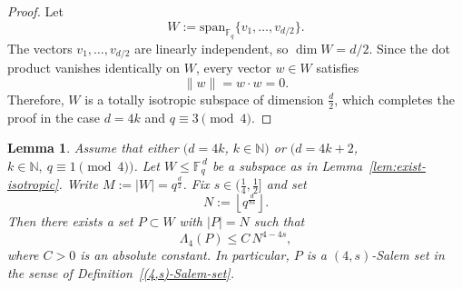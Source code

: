 \documentclass{article}
\newtheorem{lemma}[theorem]{Lemma}
\def\steven#1{\noindent
\textcolor{red}
{\textsc{(Steven:}
\textsf{#1})}}
\begin{document}
\begin{proof}
Let
\[
W:=\mathrm{span}_{\mathbb F_q}\{v_1,\dots,v_{d/2}\}.
\]
The vectors $v_1,\dots,v_{d/2}$ are linearly independent, so
$\dim W=d/2$.
Since the dot product vanishes identically on $W$, every vector $w\in W$ satisfies
\[
\|w\|=w\cdot w=0.
\]
Therefore, $W$ is a totally isotropic subspace of dimension $\frac{d}{2}$, which completes the proof in the case $d=4k$ and $q\equiv3\pmod4$.

\end{proof}



\begin{lemma}\label{lem:salem-subset-W}
Assume that either $(d=4k$, $k \in \mathbb{N})$ or $(d=4k+2$, $k \in \mathbb{N}, ~q \equiv 1 \pmod {4})$. Let $W\le \mathbb{F}_q^{\,d}$ be a subspace as in Lemma~\ref{lem:exist-isotropic}.
Write $M:=|W|=q^{\frac d2}$.
Fix $s\in(\frac14,\frac12]$ and set
\[
N:=\left\lfloor q^{\frac{d}{8s}}\right\rfloor. %
\]
Then there exists a set $P\subset W$ with $|P|=N$ such that
\[
\Lambda_4(P)\le C\,N^{4-4s},
\]
where $C>0$ is an absolute constant.
In particular, $P$ is a $(4,s)$-Salem set in the sense of Definition~\ref{(4,s)-Salem-set}.
\end{lemma}
\end{document}
